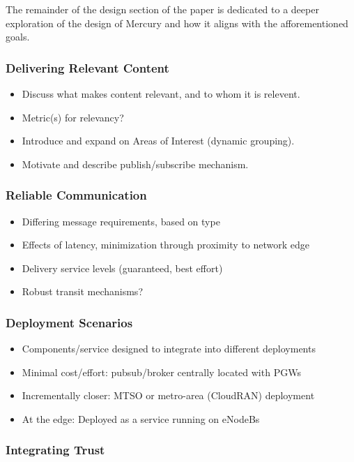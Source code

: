 The remainder of the design section of the paper is dedicated to a
deeper exploration of the design of Mercury and how it aligns with the
afforementioned goals.

\subsubsection{Delivering Relevant Content}

\begin{itemize}
\item Discuss what makes content relevant, and to whom it is relevent.
\item Metric(s) for relevancy?
\item Introduce and expand on Areas of Interest (dynamic grouping).
\item Motivate and describe publish/subscribe mechanism.
\end{itemize}

\subsubsection{Reliable Communication}

\begin{itemize}
\item Differing message requirements, based on type
\item Effects of latency, minimization through proximity to network edge
\item Delivery service levels (guaranteed, best effort)
\item Robust transit mechanisms?
\end{itemize}

\subsubsection{Deployment Scenarios}

\begin{itemize}
\item Components/service designed to integrate into different deployments
\item Minimal cost/effort: pubsub/broker centrally located with PGWs
\item Incrementally closer: MTSO or metro-area (CloudRAN) deployment
\item At the edge: Deployed as a service running on eNodeBs
\end{itemize}

\subsubsection{Integrating Trust}

